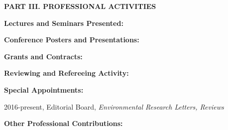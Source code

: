 \documentclass[10pt]{article}
\begin{document}

\vspace{0.5cm}
\textbf{PART III.  PROFESSIONAL ACTIVITIES}

\vspace{0.5cm}
\textbf{Lectures and Seminars Presented:}
\vspace{0.25cm}
{\setlength{\extrarowheight}{3.5pt}

}


\vspace{0.5cm}
\textbf{Conference Posters and Presentations:}
\vspace{0.25cm}
{\setlength{\extrarowheight}{3.5pt}

}

\vspace{0.5cm}
\textbf{Grants and Contracts:}
\vspace{0.25cm}
{\setlength{\extrarowheight}{3.5pt}

}

\vspace{0.5cm}
\textbf{Reviewing and Refereeing Activity:}
\vspace{0.2cm}


\vspace{0.25cm}
\textbf{Special Appointments:}

\hspace{0.5cm} 2016-present, Editorial Board, \textit{Environmental Research Letters, Reviews}

\vspace{0.25cm}
\textbf{Other Professional Contributions:}
\hspace{0.5cm}
\begin{tabular}{lp{2cm}p{12cm}}
\end{tabular}
\end{document}
